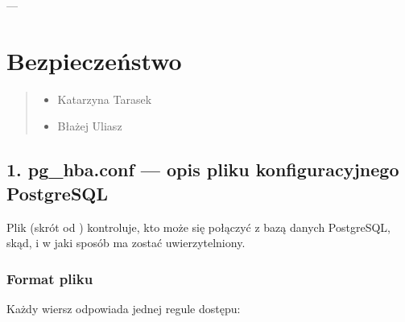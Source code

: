 \documentclass[a4paper,11pt,polish]{sphinxmanual}
\begin{document}
\sphinxAtStartPar
—

\sphinxstepscope


\chapter{Bezpieczeństwo}
\label{\detokenize{Bezpieczenstwo/index:bezpieczenstwo}}\label{\detokenize{Bezpieczenstwo/index::doc}}\begin{quote}\begin{description}
\begin{itemize}
\item {} 
\sphinxAtStartPar
Katarzyna Tarasek

\item {} 
\sphinxAtStartPar
Błażej Uliasz

\end{itemize}

\end{description}\end{quote}


\section{1. pg\_hba.conf — opis pliku konfiguracyjnego PostgreSQL}
\label{\detokenize{Bezpieczenstwo/index:pg-hba-conf-opis-pliku-konfiguracyjnego-postgresql}}
\sphinxAtStartPar
Plik  (skrót od ) kontroluje, kto może się połączyć z bazą danych PostgreSQL, skąd, i w jaki sposób ma zostać uwierzytelniony.


\subsection{Format pliku}
\label{\detokenize{Bezpieczenstwo/index:format-pliku}}
\sphinxAtStartPar
Każdy wiersz odpowiada jednej regule dostępu:

\begin{sphinxVerbatim}[commandchars=\\\{\}]
           \PYG{p}{[}\PYG{p}{]}
\end{sphinxVerbatim}
\end{document}

